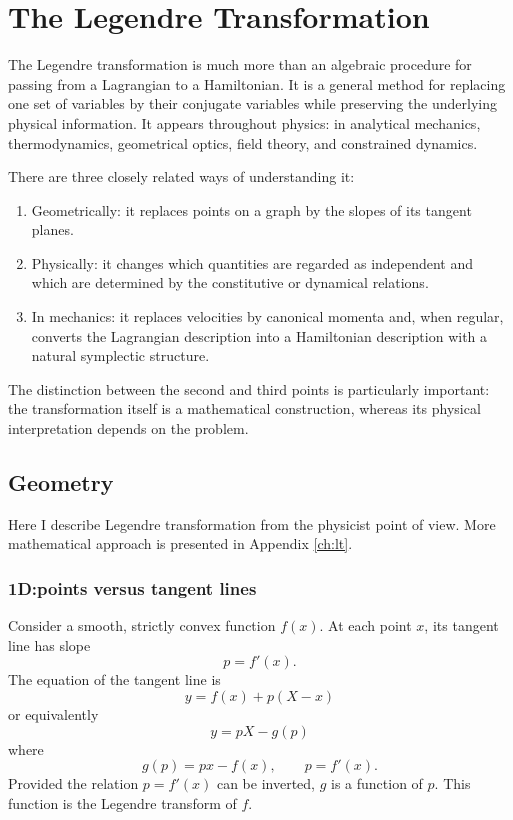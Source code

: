 \chapter{The Legendre Transformation}
\label{ch:leg}

The Legendre transformation is much more than an algebraic procedure for
passing from a Lagrangian to a Hamiltonian. It is a general method for
replacing one set of variables by their conjugate variables while preserving
the underlying physical information. It appears throughout physics: in
analytical mechanics, thermodynamics, geometrical optics, field theory, and
constrained dynamics.

There are three closely related ways of understanding it:
\begin{enumerate}
   \item Geometrically: it replaces points on a graph by the slopes of its
       tangent planes.
   \item Physically: it changes which quantities are regarded as independent
       and which are determined by the constitutive or dynamical relations.
   \item In mechanics: it replaces velocities by canonical momenta and, when
       regular, converts the Lagrangian description into a Hamiltonian
        description with a natural symplectic structure.
\end{enumerate}
 The distinction between the second and third points is particularly important:
 the transformation itself is a mathematical construction, whereas its physical
 interpretation depends on the problem.

 \section{Geometry}
 \label{sec:lag-geom}
 Here I describe Legendre transformation from the physicist point of view. More
 mathematical approach is presented in Appendix \ref{ch:lt}.
 \subsection{1D:points versus tangent lines}
Consider a smooth, strictly convex function \(f(x)\).
At each point \(x\), its tangent line has slope
\[
p=f'(x).
\]
The equation of the tangent line is
\[
y=f(x)+p(X-x)
\]
or equivalently
\[
\boxed{y=pX-g(p)}
\]
where
\[
\boxed{g(p)=px-f(x),\qquad p=f'(x).}
\]
Provided the relation \(p=f'(x)\) can be inverted, \(g\) is a function of \(p\).
This function is the Legendre transform of \(f\).

